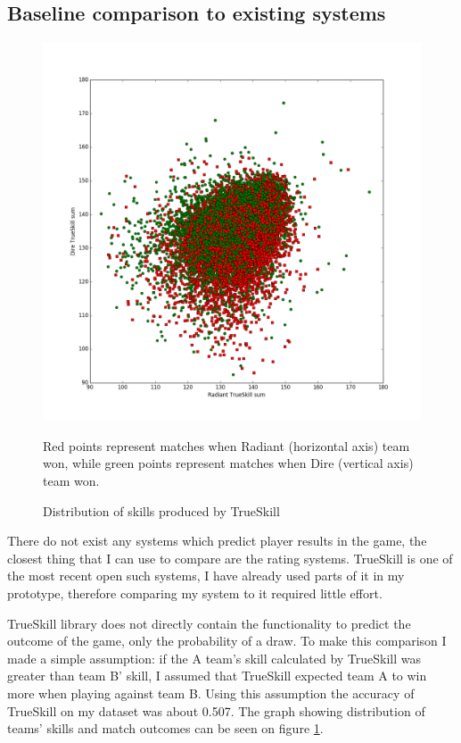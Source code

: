 \documentclass[12pt,a4paper]{book}
\newcommand\note[1]{\vspace*{-0.5\baselineskip}\caption*{#1}}
\begin{document}
\subsection{Baseline comparison to existing systems}
\begin{figure}[ht]
\centering
\includegraphics[scale=0.4]{winrate}
\caption{Distribution of skills produced by TrueSkill}
\note{Red points represent matches when Radiant (horizontal axis) team won, while green points represent matches when Dire (vertical axis) team won.}
\label{fig:winrate}
\end{figure}
There do not exist any systems which predict player results in the game, the closest thing that I can use to compare are the rating systems.
TrueSkill is one of the most recent open such systems, I have already used parts of it in my prototype, therefore comparing my system to it required little effort.

TrueSkill library does not directly contain the functionality to predict the outcome of the game, only the probability of a draw.
To make this comparison I made a simple assumption: if the A team's skill calculated by TrueSkill was greater than team B' skill, I assumed that TrueSkill expected team A to win more when playing against team B.
Using this assumption the accuracy of TrueSkill on my dataset was about 0.507.
The graph showing distribution of teams' skills and match outcomes can be seen on figure \ref{fig:winrate}.
\end{document}
